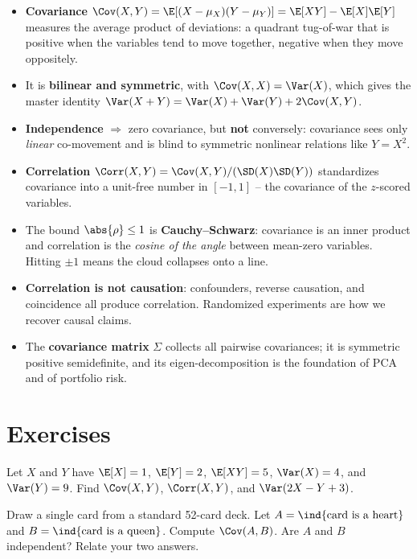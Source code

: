 \begin{itemize}
\item \textbf{Covariance} $\Cov(X,Y) = \E[(X-\mu_X)(Y-\mu_Y)] = \E[XY] -
\E[X]\E[Y]$ measures the average product of deviations: a quadrant tug-of-war that
is positive when the variables tend to move together, negative when they move
oppositely.
\item It is \textbf{bilinear and symmetric}, with $\Cov(X,X) = \Var(X)$, which gives
the master identity $\Var(X+Y) = \Var(X) + \Var(Y) + 2\Cov(X,Y)$.
\item \textbf{Independence} $\Rightarrow$ zero covariance, but \textbf{not}
conversely: covariance sees only \emph{linear} co-movement and is blind to symmetric
nonlinear relations like $Y = X^2$.
\item \textbf{Correlation} $\Corr(X,Y) = \Cov(X,Y)/(\SD(X)\SD(Y))$ standardizes
covariance into a unit-free number in $[-1,1]$ -- the covariance of the
$z$-scored variables.
\item The bound $\abs{\rho}\le 1$ is \textbf{Cauchy--Schwarz}: covariance is an
inner product and correlation is the \emph{cosine of the angle} between mean-zero
variables. Hitting $\pm 1$ means the cloud collapses onto a line.
\item \textbf{Correlation is not causation}: confounders, reverse causation, and
coincidence all produce correlation. Randomized experiments are how we recover
causal claims.
\item The \textbf{covariance matrix} $\Sigma$ collects all pairwise covariances; it
is symmetric positive semidefinite, and its eigen-decomposition is the foundation of
PCA and of portfolio risk.
\end{itemize}

\section{Exercises}
\label{ch14:exercises}

\begin{exercise}
\label{ch14:ex-warmup}
Let $X$ and $Y$ have $\E[X] = 1$, $\E[Y] = 2$, $\E[XY] = 5$, $\Var(X) = 4$, and
$\Var(Y) = 9$. Find $\Cov(X,Y)$, $\Corr(X,Y)$, and $\Var(2X - Y + 3)$.
\end{exercise}

\begin{exercise}
\label{ch14:ex-indicator}
Draw a single card from a standard 52-card deck. Let $A = \ind\{\text{card is a
heart}\}$ and $B = \ind\{\text{card is a queen}\}$. Compute $\Cov(A, B)$. Are $A$
and $B$ independent? Relate your two answers.
\end{exercise}

